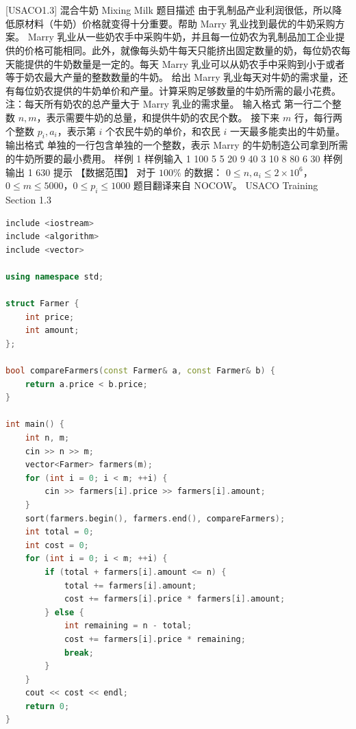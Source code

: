 \documentclass[12pt,twiside,a4paper]{ctexbook}
\numberwithin{chapter}{part}
\begin{document}
\section{}
 [USACO1.3] 混合牛奶 Mixing Milk
 题目描述
由于乳制品产业利润很低，所以降低原材料（牛奶）价格就变得十分重要。帮助 Marry 乳业找到最优的牛奶采购方案。
Marry 乳业从一些奶农手中采购牛奶，并且每一位奶农为乳制品加工企业提供的价格可能相同。此外，就像每头奶牛每天只能挤出固定数量的奶，每位奶农每天能提供的牛奶数量是一定的。每天 Marry 乳业可以从奶农手中采购到小于或者等于奶农最大产量的整数数量的牛奶。
给出 Marry 乳业每天对牛奶的需求量，还有每位奶农提供的牛奶单价和产量。计算采购足够数量的牛奶所需的最小花费。
注：每天所有奶农的总产量大于 Marry 乳业的需求量。
 输入格式
第一行二个整数 $n,m$，表示需要牛奶的总量，和提供牛奶的农民个数。
接下来 $m$ 行，每行两个整数 $p_i,a_i$，表示第 $i$ 个农民牛奶的单价，和农民 $i$ 一天最多能卖出的牛奶量。
 输出格式
单独的一行包含单独的一个整数，表示 Marry 的牛奶制造公司拿到所需的牛奶所要的最小费用。
 样例 1
 样例输入 1
100 5
5 20
9 40
3 10
8 80
6 30
 样例输出 1
630
 提示
【数据范围】  
对于 $100\%$ 的数据：  
$0 \le n,a_i \le 2 \times 10^6$，$0\le m \le 5000$，$0 \le p_i \le 1000$
题目翻译来自 NOCOW。
USACO Training Section 1.3
\begin{lstlisting}[language=c++,breaklines=true]
include <iostream>
include <algorithm>
include <vector>

using namespace std;

struct Farmer {
    int price;
    int amount;
};

bool compareFarmers(const Farmer& a, const Farmer& b) {
    return a.price < b.price;
}

int main() {
    int n, m;
    cin >> n >> m;
    vector<Farmer> farmers(m);
    for (int i = 0; i < m; ++i) {
        cin >> farmers[i].price >> farmers[i].amount;
    }
    sort(farmers.begin(), farmers.end(), compareFarmers);
    int total = 0;
    int cost = 0;
    for (int i = 0; i < m; ++i) {
        if (total + farmers[i].amount <= n) {
            total += farmers[i].amount;
            cost += farmers[i].price * farmers[i].amount;
        } else {
            int remaining = n - total;
            cost += farmers[i].price * remaining;
            break;
        }
    }
    cout << cost << endl;
    return 0;
}
\end{lstlisting}
\end{document}
